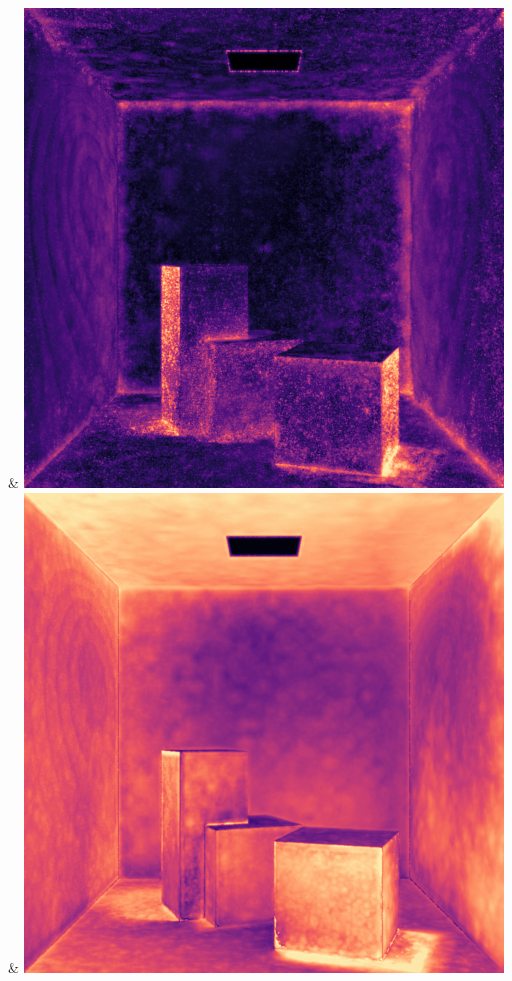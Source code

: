 & \includegraphics[width=\linewidth]{figures/py/tests/quality_comparison/nrc+bt_1spp_diffuse_flip.png}
& \includegraphics[width=\linewidth]{figures/py/tests/quality_comparison/nrc+lt_1spp_diffuse_flip.png}
